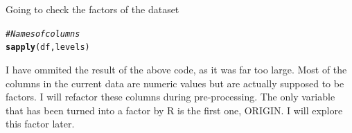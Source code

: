 \documentclass{article}\usepackage[]{graphicx}\usepackage[]{color}
\makeatletter
\newcommand{\hlcom}[1]{\textcolor[rgb]{0.678,0.584,0.686}{\textit{#1}}}%
\newcommand{\hlstd}[1]{\textcolor[rgb]{0.345,0.345,0.345}{#1}}%
\newcommand{\hlkwd}[1]{\textcolor[rgb]{0.737,0.353,0.396}{\textbf{#1}}}%
\newenvironment{kframe}{%
 \def\at@end@of@kframe{}%
 \ifinner\ifhmode%
  \def\at@end@of@kframe{\end{minipage}}%
  \begin{minipage}{\columnwidth}%
 \fi\fi%
 \def\FrameCommand##1{\hskip\@totalleftmargin \hskip-\fboxsep
 \colorbox{shadecolor}{##1}\hskip-\fboxsep
     \hskip-\linewidth \hskip-\@totalleftmargin \hskip\columnwidth}%
 \MakeFramed {\advance\hsize-\width
   \@totalleftmargin\z@ \linewidth\hsize
   \@setminipage}}%
 {\par\unskip\endMakeFramed%
 \at@end@of@kframe}
\newenvironment{knitrout}{}{} %
\makeatother
\begin{document}
Going to check the factors of the dataset
\begin{knitrout}
\color{fgcolor}\begin{kframe}
\begin{alltt}
\hlcom{#Names of columns }
\hlkwd{sapply}\hlstd{(df,levels)}
\end{alltt}
\end{kframe}
\end{knitrout}
I have ommited the result of the above code, as it was far too large. Most of the columns in the current data are numeric values but are actually supposed to be factors. I will refactor these columns during pre-processing. The only variable that has been turned into a factor by R is the first one, ORIGIN. I will explore this factor later. 
\end{document}
